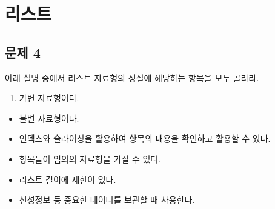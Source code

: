 \documentclass[11pt]{article}
\providecommand{\tightlist}{%
      \setlength{\itemsep}{0pt}\setlength{\parskip}{0pt}}
\begin{document}
\iffalse
\section*{오류 및 예외 처리}\label{uxc624uxb958-uxbc0f-uxc608uxc678-uxcc98uxb9ac}

\subsection*{문제 3}
\label{uxc544uxb798-uxcf54uxb4dcuxac00-uxd558uxb294-uxc77cuxc744-uxc124uxba85uxd558uxb77c.}

아래 코드가 하는 일을 설명하라.
\begin{verbatim}
number_to_square = raw_input("A number to divide 100: ")

try:
    number = float(number_to_square)
    print("100을 입력한 값으로 나눈 결과는", 100/number, "입니다.")
except ZeroDivisionError:
    raise ZeroDivisionError('0이 아닌 숫자를 입력하세요.')
except ValueError:
    raise ValueError('숫자를 입력하세요.')
\end{verbatim}

\begin{Verbatim}







\end{Verbatim}
\fi

\iffalse
\section*{리스트}\label{uxb9acuxc2a4uxd2b8}

\subsection*{문제 4}\label{uxbb38uxc81c}

아래 설명 중에서 리스트 자료형의 성질에 해당하는 항목을 모두 골라라.

\begin{enumerate}
\def\labelenumi{\arabic{enumi}.}
\tightlist
\item
  가변 자료형이다.
\end{enumerate}

\begin{itemize}
\tightlist
\item
  불변 자료형이다.
\item
  인덱스와 슬라이싱을 활용하여 항목의 내용을 확인하고 활용할 수 있다.
\item
  항목들이 임의의 자료형을 가질 수 있다.
\item
  리스트 길이에 제한이 있다.
\item
  신성정보 등 중요한 데이터를 보관할 때 사용한다.
\end{itemize}
\end{document}
